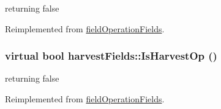 returning false 

Reimplemented from \hyperlink{classfield_operation_fields_aad34a4f52c734a152ad3768fca005b6e}{fieldOperationFields}.\hypertarget{classharvest_fields_ab50f128112be82518c06028ecb470cb7}{
\subsubsection[{IsHarvestOp}]{\setlength{\rightskip}{0pt plus 5cm}virtual bool harvestFields::IsHarvestOp ()}}
\label{classharvest_fields_ab50f128112be82518c06028ecb470cb7}


returning false 

Reimplemented from \hyperlink{classfield_operation_fields_ad9bda8d7d67001b38bc34e82fa344fca}{fieldOperationFields}.

